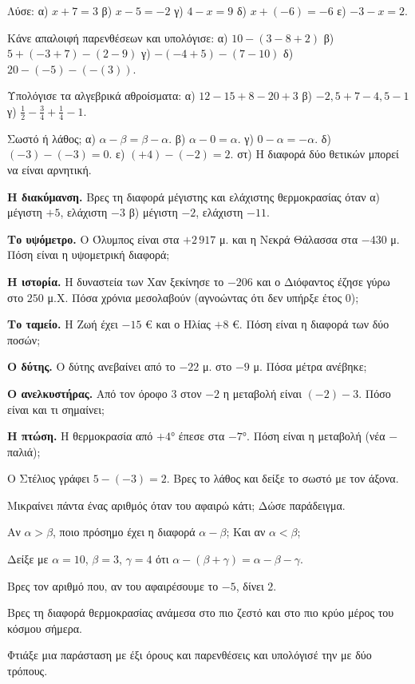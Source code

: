 \ex Λύσε: α) $x+7=3$ \quad β) $x-5=-2$ \quad γ) $4-x=9$ \quad δ) $x+(-6)=-6$ \quad ε) $-3-x=2$.

\ex Κάνε απαλοιφή παρενθέσεων και υπολόγισε: α) $10-(3-8+2)$ \quad β) $5+(-3+7)-(2-9)$ \quad γ) $-(-4+5)-(7-10)$ \quad δ) $20-(-5)-(-(3))$.

\ex Υπολόγισε τα αλγεβρικά αθροίσματα: α) $12-15+8-20+3$ \quad β) $-2{,}5+7-4{,}5-1$ \quad γ) $\frac{1}{2}-\frac{3}{4}+\frac{1}{4}-1$.

\ex Σωστό ή λάθος; α) $\alpha-\beta=\beta-\alpha$. \quad β) $\alpha-0=\alpha$. \quad γ) $0-\alpha=-\alpha$. \quad δ) $(-3)-(-3)=0$. \quad ε) $(+4)-(-2)=2$. \quad στ) Η διαφορά δύο θετικών μπορεί να είναι αρνητική.


\ex \textbf{Η διακύμανση.} Βρες τη διαφορά μέγιστης και ελάχιστης θερμοκρασίας όταν α) μέγιστη $+5$, ελάχιστη $-3$ \quad β) μέγιστη $-2$, ελάχιστη $-11$.

\ex \textbf{Το υψόμετρο.} Ο Όλυμπος είναι στα $+2\,917$ μ. και η Νεκρά Θάλασσα στα $-430$ μ. Πόση είναι η υψομετρική διαφορά;

\ex \textbf{Η ιστορία.} Η δυναστεία των Χαν ξεκίνησε το $-206$ και ο Διόφαντος έζησε γύρω στο $250$ μ.Χ. Πόσα χρόνια μεσολαβούν (αγνοώντας ότι δεν υπήρξε έτος $0$);

\ex \textbf{Το ταμείο.} Η Ζωή έχει $-15$ € και ο Ηλίας $+8$ €. Πόση είναι η διαφορά των δύο ποσών;

\ex \textbf{Ο δύτης.} Ο δύτης ανεβαίνει από το $-22$ μ. στο $-9$ μ. Πόσα μέτρα ανέβηκε;

\ex \textbf{Ο ανελκυστήρας.} Από τον όροφο $3$ στον $-2$ η μεταβολή είναι $(-2)-3$. Πόσο είναι και τι σημαίνει;

\ex \textbf{Η πτώση.} Η θερμοκρασία από $+4$° έπεσε στα $-7$°. Πόση είναι η μεταβολή (νέα $-$ παλιά);


\ex Ο Στέλιος γράφει $5-(-3)=2$. Βρες το λάθος και δείξε το σωστό με τον άξονα.

\ex Μικραίνει πάντα ένας αριθμός όταν του αφαιρώ κάτι; Δώσε παράδειγμα.

\ex Αν $\alpha>\beta$, ποιο πρόσημο έχει η διαφορά $\alpha-\beta$; Και αν $\alpha<\beta$;

\ex Δείξε με $\alpha=10$, $\beta=3$, $\gamma=4$ ότι $\alpha-(\beta+\gamma)=\alpha-\beta-\gamma$.

\ex Βρες τον αριθμό που, αν του αφαιρέσουμε το $-5$, δίνει $2$.


\ex Βρες τη διαφορά θερμοκρασίας ανάμεσα στο πιο ζεστό και στο πιο κρύο μέρος του κόσμου σήμερα.

\ex Φτιάξε μια παράσταση με έξι όρους και παρενθέσεις και υπολόγισέ την με δύο τρόπους.
